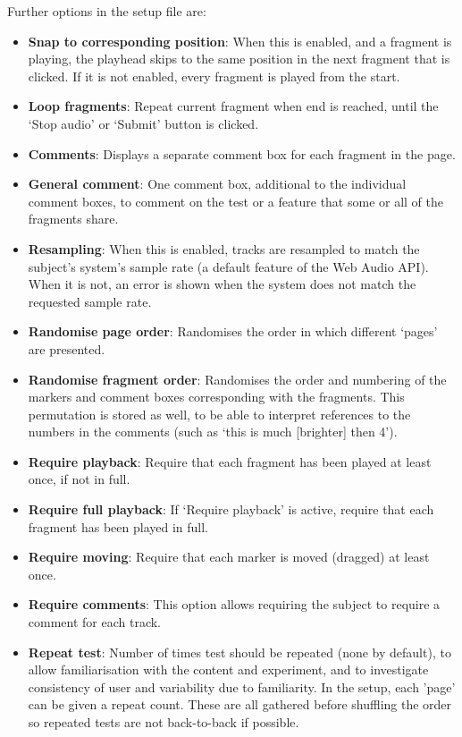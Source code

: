 \documentclass{article}
\begin{document}
Further options in the setup file are: 

\begin{itemize}
\item \textbf{Snap to corresponding position}: When this is enabled, and a fragment is playing, the playhead skips to the same position in the next fragment that is clicked. If it is not enabled, every fragment is played from the start. 
\item \textbf{Loop fragments}: Repeat current fragment when end is reached, until the `Stop audio' or `Submit' button is clicked. 
\item \textbf{Comments}: Displays a separate comment box for each fragment in the page.
\item \textbf{General comment}: One comment box, additional to the individual comment boxes, to comment on the test or a feature that some or all of the fragments share. 
\item \textbf{Resampling}: When this is enabled, tracks are resampled to match the subject's system's sample rate (a default feature of the Web Audio API). When it is not, an error is shown when the system does not match the requested sample rate. 
\item \textbf{Randomise page order}: Randomises the order in which different `pages' are presented. %
\item \textbf{Randomise fragment order}: Randomises the order and numbering of the markers and comment boxes corresponding with the fragments. This permutation is stored as well, to be able to interpret references to the numbers in the comments (such as `this is much [brighter] then 4'). 
\item \textbf{Require playback}: Require that each fragment has been played at least once, if not in full. 
\item \textbf{Require full playback}: If `Require playback' is active, require that each fragment has been played in full. 
\item \textbf{Require moving}: Require that each marker is moved (dragged) at least once. 
\item \textbf{Require comments}: This option allows requiring the subject to require a comment for each track. 
\item \textbf{Repeat test}: Number of times test should be repeated (none by default), to allow familiarisation with the content and experiment, and to investigate consistency of user and variability due to familiarity. In the setup, each 'page' can be given a repeat count. These are all gathered before shuffling the order so repeated tests are not back-to-back if possible.

\end{itemize}
\end{document}
